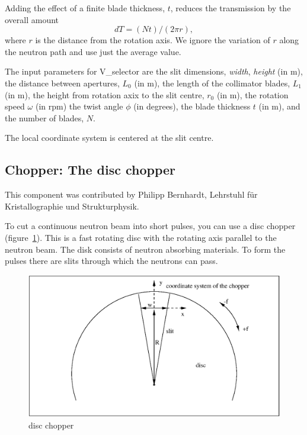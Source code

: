Adding the effect of a finite blade thickness, $t$, reduces the transmission
by the overall amount
\begin{equation}
dT = (N t) / (2\pi r ) ,
\end{equation}
where $r$ is the distance from the rotation axis. We ignore the variation
of $r$ along the neutron path and use just the average value.

The input parameters for V\_selector are the slit dimensions,
\textit{width}, \textit{height} (in m),
the distance between apertures, $L_0$ (in m), the length of the 
collimator blades, $L_1$ (in m), the height from rotation axix to the slit
centre, $r_0$ (in m), the rotation speed $\omega$ (in rpm)
the twist angle $\phi$ (in degrees), the blade thickness $t$ (in m),
and the number of blades, $N$.

The local coordinate system is centered at the slit centre.

\subsection{Chopper: The disc chopper}
\label{s:chopper}

This component was contributed by Philipp Bernhardt, Lehrstuhl f\"ur
Kristallographie und Strukturphysik.

To cut a continuous neutron beam into short pulses, you can use a disc
chopper (figure~\ref{f:chopper1}). This is a fast rotating disc with the
rotating axis parallel to the neutron beam. The disk consists of neutron
absorbing materials. To form the pulses there are slits through which
the neutrons can pass.

\begin{figure}[ht]
\includegraphics[width=1.0\linewidth]{figures/Chopper.eps}
\caption{disc chopper\label{f:chopper1}}
\end{figure}

